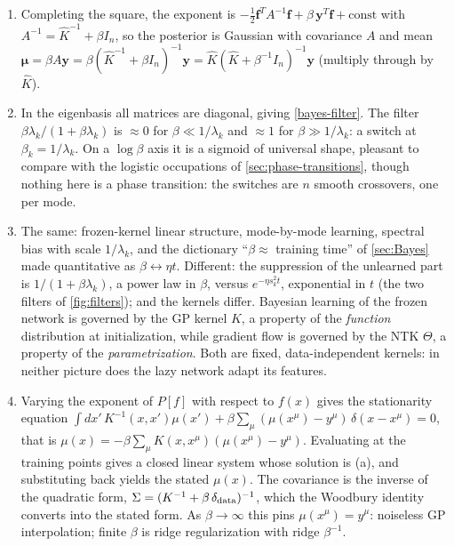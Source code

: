 \documentclass[11pt]{article}
\begin{document}
\begin{solution}
\begin{enumerate}
    \item Completing the square, the exponent is $-\frac{1}{2}\mathbf f^TA^{-1}\mathbf f + \beta\,\mathbf y^T\mathbf f + \mathrm{const}$ with $A^{-1} = \hat K^{-1}+\beta I_n$, so the posterior is Gaussian with covariance $A$ and mean $\boldsymbol\mu = \beta A\mathbf y = \beta(\hat K^{-1}+\beta I_n)^{-1}\mathbf y = \hat K(\hat K+\beta^{-1}I_n)^{-1}\mathbf y$ (multiply through by $\hat K$).
    \item In the eigenbasis all matrices are diagonal, giving \eqref{bayes-filter}. The filter $\beta\lambda_k/(1+\beta\lambda_k)$ is $\approx0$ for $\beta\ll1/\lambda_k$ and $\approx1$ for $\beta\gg1/\lambda_k$: a switch at $\beta_k = 1/\lambda_k$. On a $\log\beta$ axis it is a sigmoid of universal shape, pleasant to compare with the logistic occupations of \cref{sec:phase-transitions}, though nothing here is a phase transition: the switches are $n$ smooth crossovers, one per mode.
    \item The same: frozen-kernel linear structure, mode-by-mode learning, spectral bias with scale $1/\lambda_k$, and the dictionary ``$\beta\approx$ training time'' of \cref{sec:Bayes} made quantitative as $\beta\leftrightarrow\eta t$. Different: the suppression of the unlearned part is $1/(1+\beta\lambda_k)$, a power law in $\beta$, versus $e^{-\eta s_k^2t}$, exponential in $t$ (the two filters of \cref{fig:filters}); and the kernels differ. Bayesian learning of the frozen network is governed by the GP kernel $K$, a property of the \emph{function} distribution at initialization, while gradient flow is governed by the NTK $\Theta$, a property of the \emph{parametrization}. Both are fixed, data-independent kernels: in neither picture does the lazy network adapt its features.
    \item Varying the exponent of $P[f]$ with respect to $f(x)$ gives the stationarity equation $\int dx'\,K^{-1}(x,x')\mu(x') + \beta\sum_\mu(\mu(x^\mu)-y^\mu)\,\delta(x-x^\mu) = 0$, that is $\mu(x) = -\beta\sum_\mu K(x,x^\mu)(\mu(x^\mu)-y^\mu)$. Evaluating at the training points gives a closed linear system whose solution is (a), and substituting back yields the stated $\mu(x)$. The covariance is the inverse of the quadratic form, $\Sigma = (K^{-1}+\beta\,\delta_{\rm data})^{-1}$, which the Woodbury identity converts into the stated form. As $\beta\to\infty$ this pins $\mu(x^\mu) = y^\mu$: noiseless GP interpolation; finite $\beta$ is ridge regularization with ridge $\beta^{-1}$.
\end{enumerate}
\end{solution}
\end{document}
